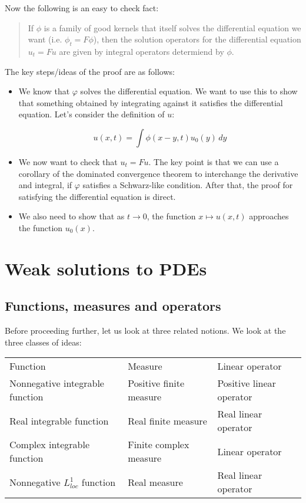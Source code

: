 \documentclass[a4paper]{amsart}
\begin{document}
Now the following is an easy to check fact:

\begin{quote}
  If $\phi$ is a family of good kernels that itself solves the
  differential equation we want (i.e. $\phi_t = F\phi$), then the
  solution operators for the differential equation $u_t = Fu$ are
  given by integral operators determiend by $\phi$.
\end{quote}

The key steps/ideas of the proof are as follows:

\begin{itemize}

\item We know that $\varphi$ solves the differential equation. We want
  to use this to show that something obtained by integrating against
  it satisfies the differential equation. Let's consider the definition of $u$:

  $$u(x,t) = \int \phi(x-y,t) u_0(y) \, dy$$

\item We now want to check that $u_t = Fu$. The key point is that we
  can use a corollary of the dominated convergence theorem to
  interchange the derivative and integral, if $\varphi$ satisfies a
  Schwarz-like condition. After that, the proof for satisfying the
  differential equation is direct.

\item We also need to show that as $t \to 0$, the function $x \mapsto
  u(x,t)$ approaches the function $u_0(x)$.

\end{itemize}

\section{Weak solutions to PDEs}

\subsection{Functions, measures and operators}

Before proceeding further, let us look at three related notions. We look at the three classes of ideas:

\begin{tabular}{|l|l|l|}
  Function & Measure & Linear operator\\
  Nonnegative integrable function & Positive finite measure & Positive linear operator\\
  Real integrable function & Real finite measure & Real linear operator \\
  Complex integrable function & Finite complex measure & Linear operator\\
  Nonnegative $L^1_{loc}$ function & Real measure & Real linear operator\\
\end{tabular}
\end{document}
